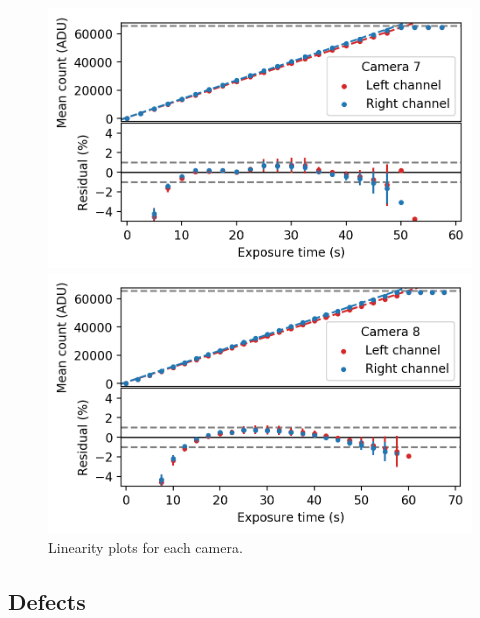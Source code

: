 \begin{colsection}
\begin{colsection}
\begin{figure}[p]
\begin{center}
        \begin{minipage}[t]{0.49\textwidth}\vspace{10pt}
            \includegraphics[width=\linewidth]{images/detectors/lin_7.png}
        \end{minipage}
        \begin{minipage}[t]{0.49\textwidth}\vspace{10pt}
            \includegraphics[width=\linewidth]{images/detectors/lin_8.png}
        \end{minipage}
    \end{center}
    \caption[Linearity plots]{
        Linearity plots for each camera.
    }\label{fig:lin}
\end{figure}

\clearpage

\end{colsection}

\newpage
\subsection{Defects}
\label{sec:defects}
\begin{colsection}


\end{colsection}
\end{colsection}
